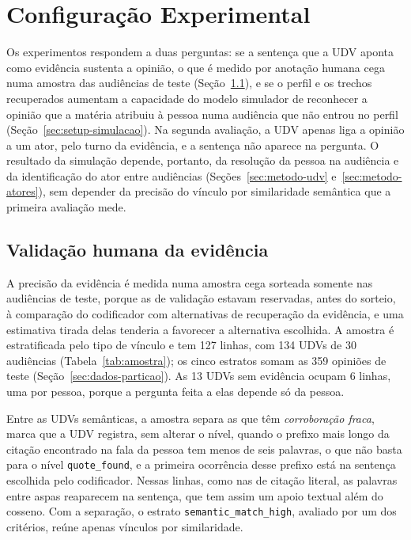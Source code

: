 \section{Configura\c{c}\~ao Experimental}
\label{sec:setup}

Os experimentos respondem a duas perguntas: se a sentença que a UDV aponta como evidência sustenta a
opinião, o que é medido por anotação humana cega numa amostra das audiências de teste
(Seção~\ref{sec:setup-udv}), e se o perfil e os trechos recuperados aumentam a capacidade do modelo
simulador de reconhecer a opinião que a matéria atribuiu à pessoa numa audiência que não entrou no
perfil (Seção~\ref{sec:setup-simulacao}). Na segunda avaliação, a UDV apenas liga a opinião a um
ator, pelo turno da evidência, e a sentença não aparece na pergunta. O resultado da simulação depende,
portanto, da resolução da pessoa na audiência e da identificação do ator entre audiências
(Seções~\ref{sec:metodo-udv} e~\ref{sec:metodo-atores}), sem depender da precisão do vínculo por
similaridade semântica que a primeira avaliação mede.

\subsection{Validação humana da evidência}
\label{sec:setup-udv}



A precisão da evidência é medida numa amostra cega sorteada somente nas audiências de teste, porque as
de validação estavam reservadas, antes do sorteio, à comparação do codificador com alternativas de
recuperação da evidência, e uma estimativa tirada delas tenderia a favorecer a alternativa escolhida.
A amostra é estratificada pelo tipo de vínculo e tem 127 linhas, com 134 UDVs de 30 audiências
(Tabela~\ref{tab:amostra}); os cinco estratos somam as 359 opiniões de teste
(Seção~\ref{sec:dados-particao}). As 13 UDVs sem evidência ocupam 6 linhas, uma por pessoa, porque a
pergunta feita a elas depende só da pessoa.

Entre as UDVs semânticas, a amostra separa as que têm \emph{corroboração fraca}, marca que a UDV
registra, sem alterar o nível, quando o prefixo mais longo da citação encontrado na fala da pessoa tem
menos de seis palavras, o que não basta para o nível \texttt{quote\_found}, e a primeira ocorrência
desse prefixo está na sentença escolhida pelo codificador. Nessas linhas, como nas de citação literal,
as palavras entre aspas reaparecem na sentença, que tem assim um apoio textual além do cosseno. Com a
separação, o estrato \texttt{semantic\_match\_high}, avaliado por um dos critérios, reúne apenas
vínculos por similaridade.

